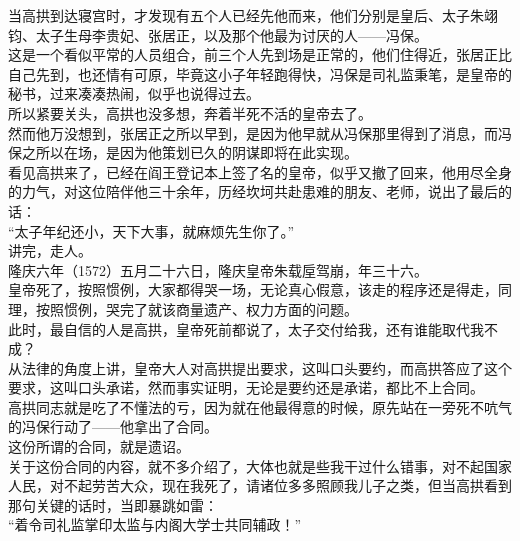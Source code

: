 \begin{multicols}{\theparacolNo}
当高拱到达寝宫时，才发现有五个人已经先他而来，他们分别是皇后、太子朱翊钧、太子生母李贵妃、张居正，以及那个他最为讨厌的人——冯保。\\

这是一个看似平常的人员组合，前三个人先到场是正常的，他们住得近，张居正比自己先到，也还情有可原，毕竟这小子年轻跑得快，冯保是司礼监秉笔，是皇帝的秘书，过来凑凑热闹，似乎也说得过去。\\

所以紧要关头，高拱也没多想，奔着半死不活的皇帝去了。\\

然而他万没想到，张居正之所以早到，是因为他早就从冯保那里得到了消息，而冯保之所以在场，是因为他策划已久的阴谋即将在此实现。\\

看见高拱来了，已经在阎王登记本上签了名的皇帝，似乎又撤了回来，他用尽全身的力气，对这位陪伴他三十余年，历经坎坷共赴患难的朋友、老师，说出了最后的话：\\

“太子年纪还小，天下大事，就麻烦先生你了。”\\

讲完，走人。\\

隆庆六年（1572）五月二十六日，隆庆皇帝朱载垕驾崩，年三十六。\\

皇帝死了，按照惯例，大家都得哭一场，无论真心假意，该走的程序还是得走，同理，按照惯例，哭完了就该商量遗产、权力方面的问题。\\

此时，最自信的人是高拱，皇帝死前都说了，太子交付给我，还有谁能取代我不成？\\

从法律的角度上讲，皇帝大人对高拱提出要求，这叫口头要约，而高拱答应了这个要求，这叫口头承诺，然而事实证明，无论是要约还是承诺，都比不上合同。\\

高拱同志就是吃了不懂法的亏，因为就在他最得意的时候，原先站在一旁死不吭气的冯保行动了——他拿出了合同。\\

这份所谓的合同，就是遗诏。\\

关于这份合同的内容，就不多介绍了，大体也就是些我干过什么错事，对不起国家人民，对不起劳苦大众，现在我死了，请诸位多多照顾我儿子之类，但当高拱看到那句关键的话时，当即暴跳如雷：\\

“着令司礼监掌印太监与内阁大学士共同辅政！”\\


\end{multicols}
